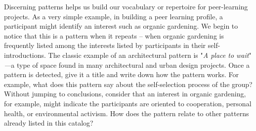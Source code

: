 Discerning patterns helps us build our vocabulary or repertoire for
peer-learning projects. As a very simple example, in building a peer
learning profile, a participant might identify an interest such as
organic gardening. We begin to notice that this is a pattern when it
repeats -- when organic gardening is frequently listed among the
interests listed by participants in their self-introductions. The
classic example of an architectural pattern is "\emph{A place to wait}"
\emph{---}a type of space found in many architectural and urban design
projects. Once a pattern is detected, give it a title and write down how
the pattern works. For example, what does this pattern say about the
self-selection process of the group? Without jumping to conclusions,
consider that an interest in organic gardening, for example, might
indicate the participants are oriented to cooperation, personal health,
or environmental activism. How does the pattern relate to other patterns
already listed in this catalog?

